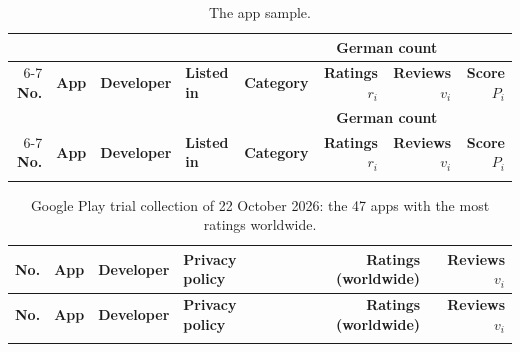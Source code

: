 \begin{landscape}
\begin{singlespace}
\small
\setlength{\tabcolsep}{4pt}
\begin{longtable}{@{}r>{\raggedright\arraybackslash}p{5.2cm}>{\raggedright\arraybackslash}p{4.8cm}llrrr@{}}
\caption{The app sample.}\label{tab:app-sample}\\
\toprule
 & & & & & \multicolumn{2}{c}{\textbf{German count}} & \\
\cmidrule(lr){6-7}
\textbf{No.} & \textbf{App} & \textbf{Developer} & \textbf{Listed in} & \textbf{Category} & \textbf{Ratings $r_i$} & \textbf{Reviews $v_i$} & \textbf{Score $P_i$} \\
\midrule
\endfirsthead
\toprule
 & & & & & \multicolumn{2}{c}{\textbf{German count}} & \\
\cmidrule(lr){6-7}
\textbf{No.} & \textbf{App} & \textbf{Developer} & \textbf{Listed in} & \textbf{Category} & \textbf{Ratings $r_i$} & \textbf{Reviews $v_i$} & \textbf{Score $P_i$} \\
\midrule
\endhead
\bottomrule
\endfoot

\end{longtable}

\begin{longtable}{@{}r>{\raggedright\arraybackslash}p{4.4cm}>{\raggedright\arraybackslash}p{3.8cm}>{\raggedright\arraybackslash}p{5.8cm}rr@{}}
\caption{Google Play trial collection of 22 October 2026: the 47 apps with
the most ratings worldwide.}\label{tab:developer-pilot}\\
\toprule
\textbf{No.} & \textbf{App} & \textbf{Developer} & \textbf{Privacy policy} & \textbf{Ratings (worldwide)} & \textbf{Reviews $v_i$} \\
\midrule
\endfirsthead
\toprule
\textbf{No.} & \textbf{App} & \textbf{Developer} & \textbf{Privacy policy} & \textbf{Ratings (worldwide)} & \textbf{Reviews $v_i$} \\
\midrule
\endhead
\bottomrule
\endfoot

\end{longtable}


\end{singlespace}
\end{landscape}
